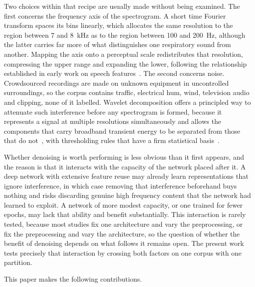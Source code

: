 \documentclass[pdflatex,sn-mathphys-num]{sn-jnl}
\begin{document}
Two choices within that recipe are usually made without being examined.
The first concerns the frequency axis of the spectrogram. A short time
Fourier transform spaces its bins linearly, which allocates the same
resolution to the region between 7 and 8~kHz as to the region between 100 and
200~Hz, although the latter carries far more of what distinguishes one
respiratory sound from another. Mapping the axis onto a perceptual scale
redistributes that resolution, compressing the upper range and expanding the
lower, following the relationship established in early work on speech
features~\cite{davis1980}. The second concerns noise. Crowdsourced recordings
are made on unknown equipment in uncontrolled surroundings, so the corpus
contains traffic, electrical hum, wind, television audio and clipping, none of
it labelled. Wavelet decomposition offers a principled way to attenuate such
interference before any spectrogram is formed, because it represents a signal
at multiple resolutions simultaneously and allows the components that carry
broadband transient energy to be separated from those that do
not~\cite{mallat1989}, with thresholding rules that have a firm statistical
basis~\cite{donoho1994, donoho1995}.

Whether denoising is worth performing is less obvious than it first appears,
and the reason is that it interacts with the capacity of the network placed
after it. A deep network with extensive feature reuse may already learn
representations that ignore interference, in which case removing that
interference beforehand buys nothing and risks discarding genuine high
frequency content that the network had learned to exploit. A network of more
modest capacity, or one trained for fewer epochs, may lack that ability and
benefit substantially. This interaction is rarely tested, because most studies
fix one architecture and vary the preprocessing, or fix the preprocessing and
vary the architecture, so the question of whether the benefit of denoising
depends on what follows it remains open. The present work tests precisely that
interaction by crossing both factors on one corpus with one partition.

This paper makes the following contributions.
\end{document}
